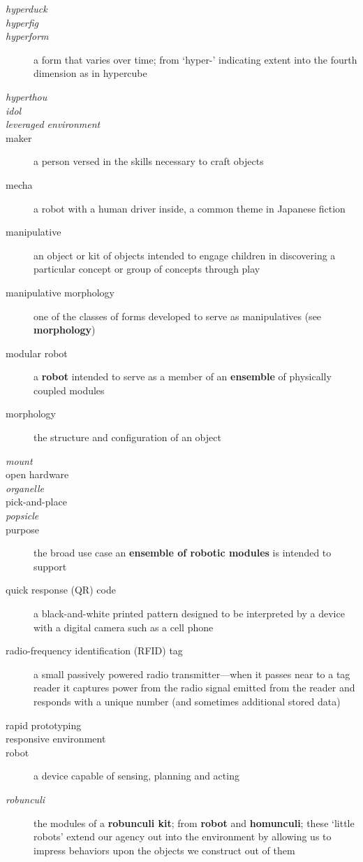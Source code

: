 \begin{description}
%
\item[\emph{hyperduck}]
%
\item[\emph{hyperfig}]
%
\item[\emph{hyperform}] a form that varies over time; from `hyper-' indicating extent into the fourth dimension as in hypercube
%
\item[\emph{hyperthou}]
%
\item[\emph{idol}]
%
\item[\emph{leveraged environment}]
%
\item[maker] a person versed in the skills necessary to craft objects
%
\item[mecha] a robot with a human driver inside, a common theme in Japanese fiction
%
\item[manipulative] an object or kit of objects intended to engage children in discovering a particular concept or group of concepts through play
%
\item[manipulative morphology] one of the classes of forms developed to serve as manipulatives (see {\bf morphology})
%
\item[modular robot] a {\bf robot} intended to serve as a member of an {\bf ensemble} of physically coupled modules
%
\item[morphology] the structure and configuration of an object
%
\item[\emph{mount}]
%
\item[open hardware]
%
\item[\emph{organelle}]
%
\item[pick-and-place]
%
\item[\emph{popsicle}]
%
\item[purpose] the broad use case an {\bf ensemble of robotic modules} is intended to support
%
\item[quick response (QR) code] a black-and-white printed pattern designed to be interpreted by a device with a digital camera such as a cell phone
%
\item[radio-frequency identification (RFID) tag] a small passively powered radio transmitter---when it passes near to a tag reader it captures power from the radio signal emitted from the reader and responds with a unique number (and sometimes additional stored data)
%
\item[rapid prototyping]
%
\item[responsive environment]
%
\item[robot] a device capable of sensing, planning and acting
%
\item[\emph{robunculi}] the modules of a {\bf robunculi kit}; from {\bf robot} and {\bf homunculi}; these `little robots' extend our agency out into the environment by allowing us to impress behaviors upon the objects we construct out of them

\end{description}
